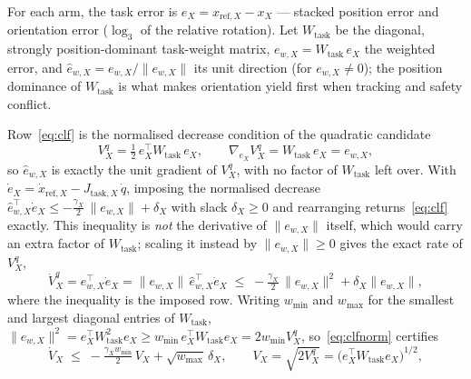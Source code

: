 \documentclass[12pt,a4paper,twoside,openright]{report}
\newcommand{\qdot}{\dot{q}}
\begin{document}
For each arm, the task error is $e_X = x_{\text{ref},X} - x_X$ --- stacked position error and orientation error ($\log_3$ of the relative rotation). Let $W_{\text{task}}$ be the diagonal, strongly position-dominant task-weight matrix, $e_{w,X} = W_{\text{task}}\,e_X$ the weighted error, and $\hat{e}_{w,X} = e_{w,X}/\|e_{w,X}\|$ its unit direction (for $e_{w,X} \neq 0$); the position dominance of $W_{\text{task}}$ is what makes orientation yield first when tracking and safety conflict.

Row~\eqref{eq:clf} is the normalised decrease condition of the quadratic candidate
\begin{equation}
V_X^{q} = \tfrac{1}{2}\,e_X^{\top} W_{\text{task}}\,e_X,
\qquad
\nabla_{e_X} V_X^{q} = W_{\text{task}}\,e_X = e_{w,X},
\label{eq:clfquadgrad}
\end{equation}
so $\hat{e}_{w,X}$ is exactly the unit gradient of $V_X^{q}$, with no factor of $W_{\text{task}}$ left over. With $\dot{e}_X = \dot{x}_{\text{ref},X} - J_{\text{task},X}\,\qdot$, imposing the normalised decrease $\hat{e}_{w,X}^{\top}\dot{e}_X \le -\tfrac{\gamma_X}{2}\,\|e_{w,X}\| + \delta_X$ with slack $\delta_X \ge 0$ and rearranging returns~\eqref{eq:clf} exactly. This inequality is \emph{not} the derivative of $\|e_{w,X}\|$ itself, which would carry an extra factor of $W_{\text{task}}$; scaling it instead by $\|e_{w,X}\| \ge 0$ gives the exact rate of $V_X^{q}$,
\begin{equation}
\dot{V}_X^{q} = e_{w,X}^{\top}\dot{e}_X = \|e_{w,X}\|\,\hat{e}_{w,X}^{\top}\dot{e}_X \;\le\; -\tfrac{\gamma_X}{2}\,\|e_{w,X}\|^2 + \delta_X\|e_{w,X}\|,
\label{eq:clfnorm}
\end{equation}
where the inequality is the imposed row. Writing $w_{\min}$ and $w_{\max}$ for the smallest and largest diagonal entries of $W_{\text{task}}$, $\|e_{w,X}\|^2 = e_X^{\top}W_{\text{task}}^2 e_X \ge w_{\min}\,e_X^{\top}W_{\text{task}}e_X = 2w_{\min}V_X^{q}$, so~\eqref{eq:clfnorm} certifies
\begin{equation}
\dot{V}_X \;\le\; -\tfrac{\gamma_X w_{\min}}{2}\,V_X + \sqrt{w_{\max}}\,\delta_X, \qquad V_X = \sqrt{2V_X^{q}} = \bigl(e_X^{\top}W_{\text{task}}e_X\bigr)^{1/2},
\label{eq:clfrate}
\end{equation}
\end{document}
